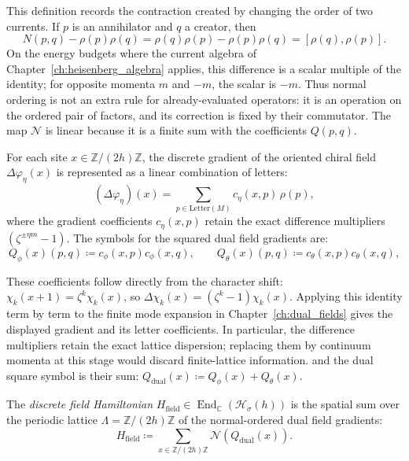 This definition records the contraction created by changing the order of two currents. If $p$ is an annihilator and $q$ a creator, then
\begin{equation}
N(p,q)-\rho(p)\rho(q)=\rho(q)\rho(p)-\rho(p)\rho(q)=[\rho(q),\rho(p)].
\end{equation}
On the energy budgets where the current algebra of Chapter~\ref{ch:heisenberg_algebra} applies, this difference is a scalar multiple of the identity; for opposite momenta $m$ and $-m$, the scalar is $-m$. Thus normal ordering is not an extra rule for already-evaluated operators: it is an operation on the ordered pair of factors, and its correction is fixed by their commutator. The map $\mathcal{N}$ is linear because it is a finite sum with the coefficients $Q(p,q)$.

For each site $x \in \mathbb{Z}/(2h)\mathbb{Z}$, the discrete gradient of the oriented chiral field $\Delta \varphi_\eta(x)$ is represented as a linear combination of letters:
\begin{equation}
(\Delta \varphi_\eta)(x) = \sum_{p \in \mathrm{Letter}(M)} c_\eta(x, p)\, \rho(p),
\end{equation}
where the gradient coefficients $c_\eta(x, p)$ retain the exact difference multipliers $(\zeta^{\pm \eta m} - 1)$. The symbols for the squared dual field gradients are:
\begin{equation}
Q_\phi(x)(p, q) \coloneqq c_\phi(x, p) c_\phi(x, q), \qquad Q_\theta(x)(p, q) \coloneqq c_\theta(x, p) c_\theta(x, q),
\end{equation}

These coefficients follow directly from the character shift: $\chi_k(x+1)=\zeta^k\chi_k(x)$, so $\Delta\chi_k(x)=(\zeta^k-1)\chi_k(x)$. Applying this identity term by term to the finite mode expansion in Chapter~\ref{ch:dual_fields} gives the displayed gradient and its letter coefficients. In particular, the difference multipliers retain the exact lattice dispersion; replacing them by continuum momenta at this stage would discard finite-lattice information.
and the dual square symbol is their sum: $Q_{\mathrm{dual}}(x) \coloneqq Q_\phi(x) + Q_\theta(x)$.

\begin{definition}
\label{def:field_hamiltonian}
The \emph{discrete field Hamiltonian} $H_{\mathrm{field}} \in \operatorname{End}_{\mathbb{C}}(\mathcal{H}_\sigma(h))$ is the spatial sum over the periodic lattice $\Lambda = \mathbb{Z}/(2h)\mathbb{Z}$ of the normal-ordered dual field gradients:
\begin{equation}
H_{\mathrm{field}} \coloneqq \sum_{x \in \mathbb{Z}/(2h)\mathbb{Z}} \mathcal{N}\left( Q_{\mathrm{dual}}(x) \right).
\end{equation}
\end{definition}

